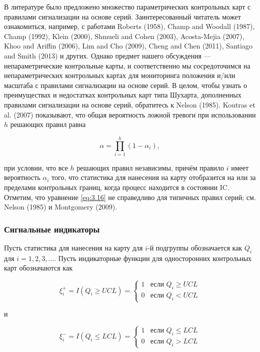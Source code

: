 В литературе было предложено множество параметрических контрольных карт с правилами сигнализации на основе серий. Заинтересованный читатель может ознакомиться, например, с работами Roberts (1958), Champ and Woodall (1987), Champ (1992), Klein (2000), Shmueli and Cohen (2003), Acosta-Mejia (2007), Khoo and Ariffin (2006), Lim and Cho (2009), Cheng and Chen (2011), Santiago and Smith (2013) и других. Однако предмет нашего обсуждения — непараметрические контрольные карты, и соответственно мы сосредоточимся на непараметрических контрольных картах для мониторинга положения и/или масштаба с правилами сигнализации на основе серий. В целом, чтобы узнать о преимуществах и недостатках контрольных карт типа Шухарта, дополненных правилами сигнализации на основе серий, обратитесь к Nelson (1985). Koutras et al. (2007) показывают, что общая вероятность ложной тревоги при использовании \(h\) решающих правил равна

\begin{equation}
	\alpha = \prod_{i=1}^{h}(1 - \alpha_{i}),
	\label{eq:3.16}
\end{equation}

при условии, что все \(h\) решающих правил независимы, причём правило \(i\) имеет вероятность \(\alpha_{i}\) того, что статистика для нанесения на карту отобразится на или за пределами контрольных границ, когда процесс находится в состоянии IC. Отметим, что уравнение \eqref{eq:3.16} не справедливо для типичных правил серий; см. Nelson (1985) и Montgomery (2009).

\subsubsection{Сигнальные индикаторы}

Пусть статистика для нанесения на карту для \(i\)-й подгруппы обозначается как \(Q_{i}\) для \(i = 1, 2, 3, \ldots\). Пусть индикаторные функции для односторонних контрольных карт обозначаются как

\begin{equation}
	\xi_{i}^{+} = I(Q_{i} \geq UCL) = \begin{cases}
		1 & \text{если } Q_{i} \geq UCL \\
		0 & \text{если } Q_{i} < UCL
	\end{cases}
	\label{eq:3.17}
\end{equation}

и

\begin{equation}
	\xi_{i}^{-} = I(Q_{i} \leq LCL) = \begin{cases}
		1 & \text{если } Q_{i} \leq LCL \\
		0 & \text{если } Q_{i} > LCL
	\end{cases}
	\label{eq:3.18}
\end{equation}

